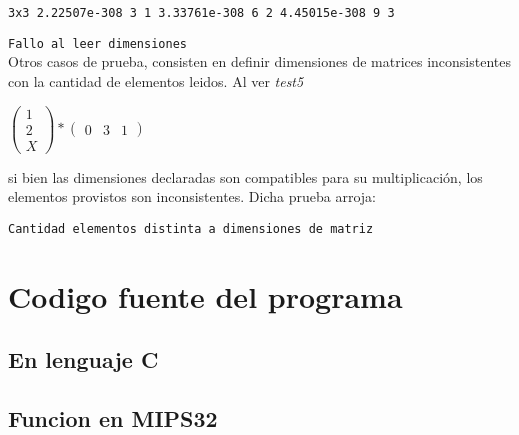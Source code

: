 \documentclass[10pt,a4paper]{article}
\begin{document}
		\texttt{3x3 2.22507e-308 3 1 3.33761e-308 6 2 4.45015e-308 9 3 }

		\texttt{Fallo al leer dimensiones}\\

		Otros casos de prueba, consisten en definir dimensiones de matrices inconsistentes con la cantidad de elementos leidos. Al ver \textit{test5}

		

		\begin{center}
		$\begin{pmatrix}
		1 \\ 2 \\ X
		\end{pmatrix}
		*
		\begin{pmatrix}
		0 & 3 & 1
		\end{pmatrix}
		$\end{center}

		si bien las dimensiones declaradas son compatibles para su multiplicación, los elementos provistos son inconsistentes. Dicha prueba arroja:

		\texttt{Cantidad elementos distinta a dimensiones de matriz}


\newpage
\section{Codigo fuente del programa}

\subsection{En lenguaje C}



\newpage
\subsection{Funcion en MIPS32}



\newpage\thispagestyle{empty}


\end{document}
